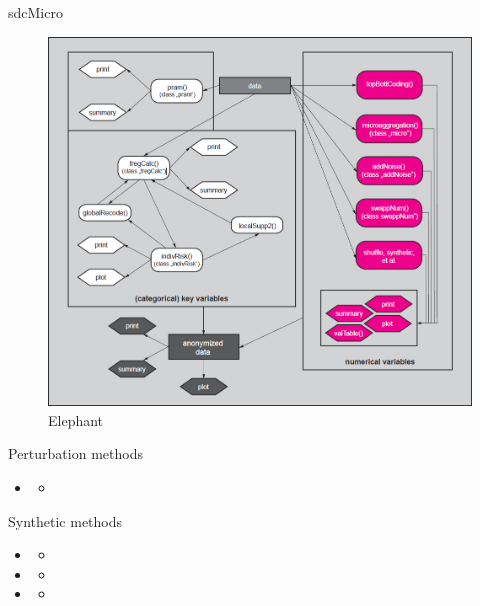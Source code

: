 \documentclass[
  ignorenonframetext,
  aspectratio=169,
]{beamer}
\begin{document}
\begin{frame}{sdcMicro}
\protect\hypertarget{sdcmicro-1}{}
\begin{figure}

{\centering \includegraphics{gallery/sdcMicro.png}

}

\caption{Elephant}

\end{figure}
\end{frame}

\begin{frame}{Perturbation methods}
\protect\hypertarget{perturbation-methods}{}
\begin{itemize}
\item
  \begin{itemize}
  \item
    \color{red}{sdcMicro}
  \end{itemize}
\end{itemize}
\end{frame}

\begin{frame}{Synthetic methods}
\protect\hypertarget{synthetic-methods}{}
\begin{itemize}
\item
  \begin{itemize}
  \item
    \color{red}{synthpop}
  \end{itemize}
\item
  \begin{itemize}
  \item
    \color{red}{simPop}
  \end{itemize}
\item
  \begin{itemize}
  \item
    \color{red}{GANs}
  \end{itemize}
\end{itemize}
\end{frame}
\end{document}
